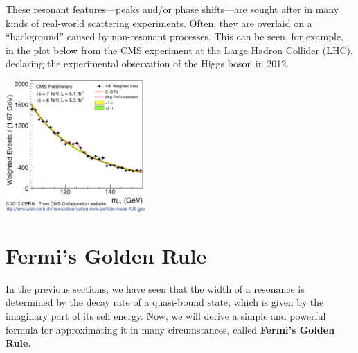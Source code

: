 \documentclass[pra,12pt]{revtex4-2}
\begin{document}
These resonant features---peaks and/or phase shifts---are sought after
in many kinds of real-world scattering experiments.  Often, they are
overlaid on a ``background'' caused by non-resonant processes.  This
can be seen, for example, in the plot below from the CMS experiment at
the Large Hadron Collider (LHC), declaring the experimental
observation of the Higgs boson in 2012.

\begin{center}
  \includegraphics[width=0.4\textwidth]{higgs}
\end{center}

\section{Fermi's Golden Rule}
\label{sec:goldenrule}

In the previous sections, we have seen that the width of a resonance
is determined by the decay rate of a quasi-bound state, which is given
by the imaginary part of its self energy.  Now, we will derive a
simple and powerful formula for approximating it in many
circumstances, called \textbf{Fermi's Golden Rule}.
\end{document}
